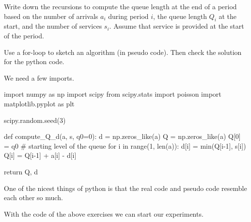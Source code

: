 \documentclass{scrartcl}
\begin{document}
\begin{exercise}
Write down the recursions to compute the queue length at the end of a period based on the number of arrivals $a_i$ during  period $i$, the queue length $Q_i$ at the start, and the number of services $s_i$. Assume that service is provided at the start of the period.  

Use a for-loop to sketch an algorithm (in pseudo code). Then check the solution for the python code.

  \begin{solution}
    We need a few imports.
\begin{pyblock}
import numpy as np
import scipy
from scipy.stats import poisson
import matplotlib.pyplot as plt

scipy.random.seed(3) 


def compute_Q_d(a, s, q0=0):
    d = np.zeros_like(a)
    Q = np.zeros_like(a)
    Q[0] = q0 # starting level of the queue
    for i in range(1, len(a)):
        d[i] = min(Q[i-1], s[i])
        Q[i] = Q[i-1] + a[i] - d[i]

    return Q, d
  
\end{pyblock}

    One of the nicest things of python is that  the real code and pseudo code resemble each other so much.
  \end{solution}
  
\end{exercise}


With the code of the above exercises we can start our experiments.
\end{document}

